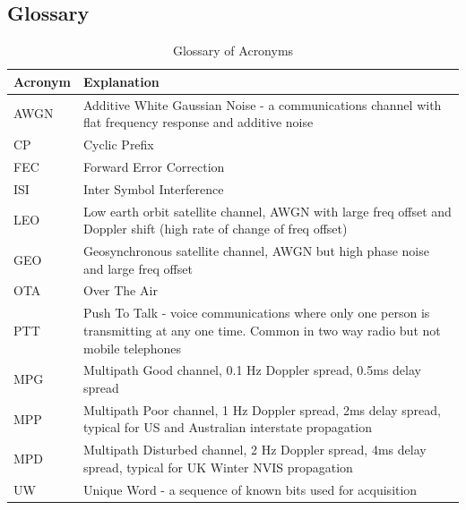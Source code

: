 \documentclass{article}
\begin{document}
\clearpage

\subsection{Glossary}

\begin{table}[H]
\centering
\begin{tabular}{l p{8cm} }
 \hline
 Acronym & Explanation \\
 \hline
 AWGN & Additive White Gaussian Noise - a communications channel with flat frequency response and additive noise \\
 CP & Cyclic Prefix \\
 FEC & Forward Error Correction \\
 ISI & Inter Symbol Interference \\
 LEO & Low earth orbit satellite channel, AWGN with large freq offset and Doppler shift (high rate of change of freq offset) \\
 GEO & Geosynchronous satellite channel, AWGN but high phase noise and large freq offset \\
 OTA & Over The Air \\
 PTT & Push To Talk - voice communications where only one person is transmitting at any one time.  Common in two way radio but not mobile telephones  \\
 MPG & Multipath Good channel, 0.1 Hz Doppler spread, 0.5ms delay spread \\
 MPP & Multipath Poor channel, 1 Hz Doppler spread, 2ms delay spread, typical for US and Australian interstate propagation \\
 MPD & Multipath Disturbed channel, 2 Hz Doppler spread, 4ms delay spread, typical for UK Winter NVIS propagation \\
 UW & Unique Word - a sequence of known bits used for acquisition \\
 \hline
\end{tabular}
\caption{Glossary of Acronyms}
\end{table}
\end{document}
